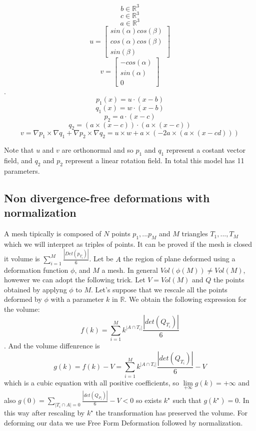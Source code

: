 \documentclass{article}
\begin{document}
$$b\in \mathbb{R}^{3}$$
$$c \in \mathbb{R}^{3}$$
$$a \in \mathbb{R}^{3}$$
$$u=\begin{bmatrix} sin(\alpha)cos(\beta) \\ cos(\alpha)cos(\beta)\\
sin(\beta)\end{bmatrix}$$
$$v=\begin{bmatrix} -cos(\alpha) \\ sin(\alpha) \\ 0\end{bmatrix}$$.
$$p_{1}(x)=u \cdot (x-b) $$
$$q_{1}(x)=w \cdot (x-b)$$
$$p_{2}=a \cdot (x-c)$$
$$q_{2}=(a\times (x-c))\cdot (a\times (x-c))$$
$$v=\nabla p_{1}\times \nabla q_{1}+\nabla p_{2}\times \nabla q_{2}=u\times w+ a \times (-2a \times (a \times (x-cd)))$$

Note that $u$ and $v$ are orthonormal and so $p_{1}$ and $q_{1}$ represent a costant vector field, and $q_{2}$ and $p_{2}$ represent a linear rotation field.
In total this model has 11 parameters.

\subsection{Non divergence-free deformations with normalization}
A mesh tipically is composed of $N$ points $p_{1},...p_{M}$ and $M$ triangles $T_{1},...,T_{M}$ which we will interpret as triples of points. It can be proved if the mesh is closed it volume is $\sum_{i=1}^{M} \frac{|Det(p_{T_{i}})|}{6}$.
Let be $A$ the region of plane deformed using a deformation function $\phi$, and $M$ a mesh. In general $Vol(\phi(M))\neq Vol(M)$, howewer we can adopt the following trick.
Let $V=Vol(M)$ and $Q$ the points obtained by applyng $\phi$ to $M$.
Let's suppose that we rescale all the points deformed by $\phi$ with a parameter $k$ in $\mathbb{R}$. We obtain the following expression for the volume:
$$f(k)=\sum_{i=1}^{M} k^{|A\cap T_{i}|}\frac{|det(Q_{T_{i}})|}{6}$$. 
And the volume diffenrence is $$g(k)=f(k)-V=\sum_{i=1}^{M} k^{|A\cap T_{i}|}\frac{|det(Q_{T_{i}})|}{6}-V$$ which is a cubic equation with all positive coefficients, so 
$\lim \limits_{+\infty} g(k)=+\infty$ and also $g(0)=\sum_{|T_{i}\cap A|=0}\frac{|det(Q_{P_{i}})|}{6}-V<0$ so exists $k^{\star}$ such that $g(k^{\star})=0$. 
In this way after rescaling by $k^{\star}$ the transformation has preserved the volume.
For deforming our data we use Free Form Deformation followed by normalization.
\end{document}
